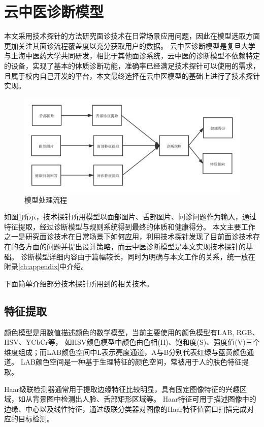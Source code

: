 \section{云中医诊断模型}
本文采用技术探针的方法研究面诊技术在日常场景应用问题，因此在模型选取方面更加关注其面诊流程覆盖度以充分获取用户的数据。
云中医诊断模型是复旦大学与上海中医药大学共同研发，相比于其他面诊系统，云中医的诊断模型不依赖特定的设备，实现了基本的体质诊断功能，准确率已经满足技术探针可以使用的需求，
且属于校内自己开发的平台，本文最终选择在云中医模型的基础上进行了技术探针实现。

\begin{figure}[htb]
    \centering
    \includegraphics[width=15cm]{images/cloud_med3.png}
    \caption{模型处理流程}
    \label{fig:cloudmed1}
\end{figure}

如图\ref{fig:cloudmed1}所示，技术探针所用模型以面部图片、舌部图片、问诊问题作为输入，通过特征提取，经过诊断模型与规则系统得到最终的体质和健康得分。
本文主要工作之一是研究面诊技术在日常场景下如何应用，利用技术探针发现了目前面诊技术存在的各方面的问题并提出设计策略，而云中医诊断模型是本文实现技术探针的基础。
诊断模型详细内容由于篇幅较长，同时为明确与本文工作的关系，统一放在附录\ref{ch:appendix}中介绍。

下面简单介绍部分技术探针所用到的相关技术。
\subsection{特征提取}
颜色模型是用数值描述颜色的数学模型，当前主要使用的颜色模型有LAB, RGB、HSV、YCbCr等，
如HSV颜色模型中颜色由色相(H)、饱和度(S)、强度值(V)三个维度组成\cite{dhivakar2015face}；而LAB颜色空间中L表示亮度通道，A与B分别代表红绿与蓝黄颜色通道。
LAB颜色空间是一种基于生理特征的颜色空间，常被用于人的肤色特征提取\cite{周睿2010中医面诊中光泽判别的研究}。

Haar级联检测器通常用于提取边缘特征比较明显，具有固定图像特征的兴趣区域，如从背景图中检测出人脸、舌部矩形区域等\cite{2001Rapid, 2007Learning}。
Haar特征可用于描述图像中的边缘、中心以及线性特征，通过级联分类器对图像的Haar特征值窗口扫描完成对应的目标检测。

